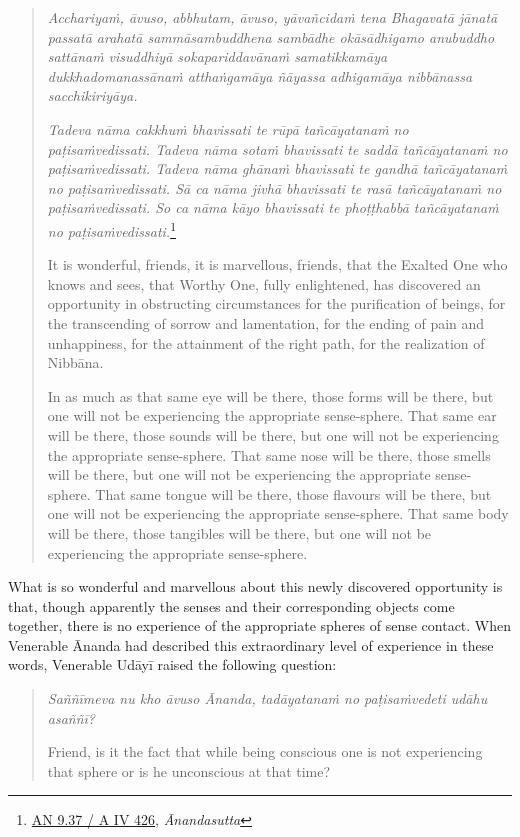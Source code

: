 \begin{quote}
\emph{Acchariyaṁ, āvuso, abbhutam, āvuso, yāvañcidaṁ tena Bhagavatā jānatā passatā arahatā sammāsambuddhena sambādhe okāsādhigamo anubuddho sattānaṁ visuddhiyā sokapariddavānaṁ samatikkamāya dukkhadomanassānaṁ atthaṅgamāya ñāyassa adhigamāya nibbānassa sacchikiriyāya.}

\emph{Tadeva nāma cakkhuṁ bhavissati te rūpā tañcāyatanaṁ no paṭisaṁvedissati. Tadeva nāma sotaṁ bhavissati te saddā tañcāyatanaṁ no paṭisaṁvedissati. Tadeva nāma ghānaṁ bhavissati te gandhā tañcāyatanaṁ no paṭisaṁvedissati. Sā ca nāma jivhā bhavissati te rasā tañcāyatanaṁ no paṭisaṁvedissati. So ca nāma kāyo bhavissati te phoṭṭhabbā tañcāyatanaṁ no paṭisaṁvedissati.}\footnote{\href{https://suttacentral.net/an9.37/pli/ms}{AN 9.37 / A IV 426}, \emph{Ānandasutta}}

It is wonderful, friends, it is marvellous, friends, that the Exalted One who knows and sees, that Worthy One, fully enlightened, has discovered an opportunity in obstructing circumstances for the purification of beings, for the transcending of sorrow and lamentation, for the ending of pain and unhappiness, for the attainment of the right path, for the realization of Nibbāna.

In as much as that same eye will be there, those forms will be there, but one will not be experiencing the appropriate sense-sphere. That same ear will be there, those sounds will be there, but one will not be experiencing the appropriate sense-sphere. That same nose will be there, those smells will be there, but one will not be experiencing the appropriate sense-sphere. That same tongue will be there, those flavours will be there, but one will not be experiencing the appropriate sense-sphere. That same body will be there, those tangibles will be there, but one will not be experiencing the appropriate sense-sphere.
\end{quote}

What is so wonderful and marvellous about this newly discovered opportunity is that, though apparently the senses and their corresponding objects come together, there is no experience of the appropriate spheres of sense contact. When Venerable Ānanda had described this extraordinary level of experience in these words, Venerable Udāyī raised the following question:

\begin{quote}
\emph{Saññīmeva nu kho āvuso Ānanda, tadāyatanaṁ no paṭisaṁvedeti udāhu asaññī?}

Friend, is it the fact that while being conscious one is not experiencing that sphere or is he unconscious at that time?
\end{quote}

